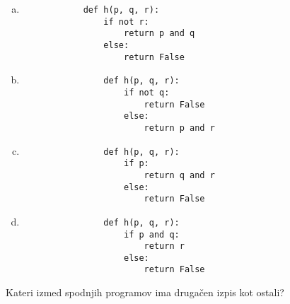 \documentclass[arhiv, 10pt]{../izpit}
\begin{document}
        \begin{multicols}{2}
        \begin{enumerate}[(a)]
\item 
            \begin{verbatim}
            def h(p, q, r):
                if not r:
                    return p and q
                else:
                    return False
            \end{verbatim}
        
\item 
                \begin{verbatim}
                def h(p, q, r):
                    if not q:
                        return False
                    else:
                        return p and r
                \end{verbatim}
            
\item 
                \begin{verbatim}
                def h(p, q, r):
                    if p:
                        return q and r
                    else:
                        return False
                \end{verbatim}
            
\item 
                \begin{verbatim}
                def h(p, q, r):
                    if p and q:
                        return r
                    else:
                        return False
                \end{verbatim}
            
\end{enumerate}

        \end{multicols}
    
        \naloga*
        
        Kateri izmed spodnjih programov ima drugačen izpis kot ostali?
    
\end{document}
